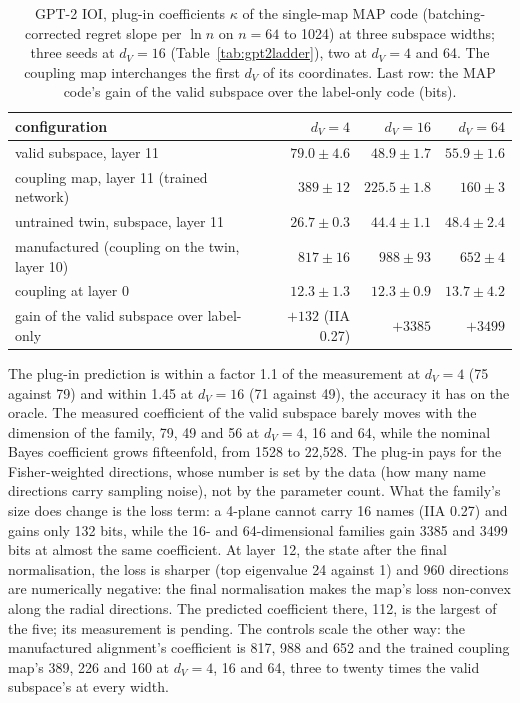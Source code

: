 \documentclass[11pt,a4paper]{article}
\newcommand{\dv}{d_V}
\begin{document}
\begin{table}[t]
\centering
\footnotesize
\caption{GPT-2 IOI, plug-in coefficients $\kappa$ of the single-map MAP code (batching-corrected regret slope per $\ln n$ on $n=64$ to 1024) at three subspace widths; three seeds at $\dv=16$ (Table~\ref{tab:gpt2ladder}), two at $\dv=4$ and 64. The coupling map interchanges the first $\dv$ of its coordinates. Last row: the MAP code's gain of the valid subspace over the label-only code (bits).}
\label{tab:gpt2dv}
\begin{tabular}{lrrr}
\toprule
configuration & $\dv=4$ & $\dv=16$ & $\dv=64$\\
\midrule
valid subspace, layer 11 & $79.0\pm4.6$ & $48.9\pm1.7$ & $55.9\pm1.6$\\
coupling map, layer 11 (trained network) & $389\pm12$ & $225.5\pm1.8$ & $160\pm3$\\
untrained twin, subspace, layer 11 & $26.7\pm0.3$ & $44.4\pm1.1$ & $48.4\pm2.4$\\
manufactured (coupling on the twin, layer 10) & $817\pm16$ & $988\pm93$ & $652\pm4$\\
coupling at layer 0 & $12.3\pm1.3$ & $12.3\pm0.9$ & $13.7\pm4.2$\\
\midrule
gain of the valid subspace over label-only & $+132$ (IIA 0.27) & $+3385$ & $+3499$\\
\bottomrule
\end{tabular}
\end{table}

The plug-in prediction is within a factor 1.1 of the measurement at $\dv=4$ (75 against 79) and within 1.45 at $\dv=16$ (71 against 49), the accuracy it has on the oracle. The measured coefficient of the valid subspace barely moves with the dimension of the family, 79, 49 and 56 at $\dv=4$, 16 and 64, while the nominal Bayes coefficient grows fifteenfold, from 1528 to 22{,}528. The plug-in pays for the Fisher-weighted directions, whose number is set by the data (how many name directions carry sampling noise), not by the parameter count. What the family's size does change is the loss term: a 4-plane cannot carry 16 names (IIA 0.27) and gains only 132 bits, while the 16- and 64-dimensional families gain 3385 and 3499 bits at almost the same coefficient. At layer~12, the state after the final normalisation, the loss is sharper (top eigenvalue 24 against 1) and 960 directions are numerically negative: the final normalisation makes the map's loss non-convex along the radial directions. The predicted coefficient there, 112, is the largest of the five; its measurement is pending. The controls scale the other way: the manufactured alignment's coefficient is 817, 988 and 652 and the trained coupling map's 389, 226 and 160 at $\dv=4$, 16 and 64, three to twenty times the valid subspace's at every width.
\end{document}
